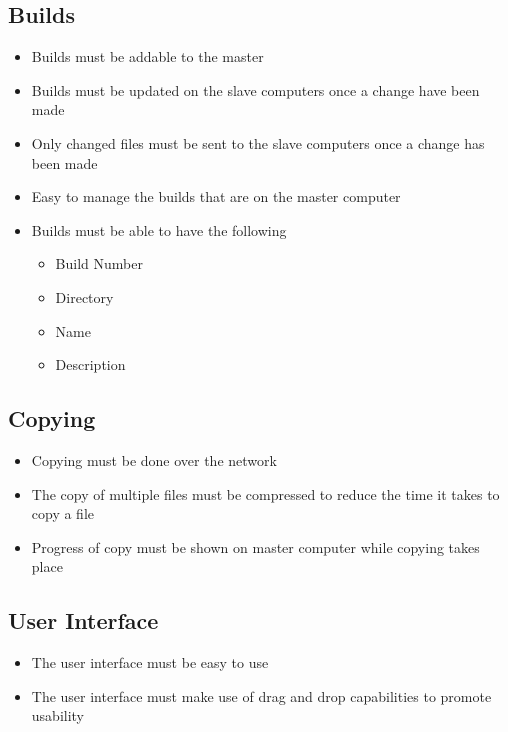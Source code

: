 \documentclass[a4paper,12pt,final]{article}
\begin{document}
\subsection{Builds}
\begin{itemize}
\item Builds must be addable to the master
\item Builds must be updated on the slave computers once a change have been made
\item Only changed files must be sent to the slave computers once a change has been made
\item Easy to manage the builds that are on the master computer
\item Builds must be able to have the following
\begin{itemize}
\item Build Number
\item Directory
\item Name
\item Description
\end{itemize}
\end{itemize}

\subsection{Copying}
\begin{itemize}
\item Copying must be done over the network
\item The copy of multiple files must be compressed to reduce the time it takes to copy a file
\item Progress of copy must be shown on master computer while copying takes place
\end{itemize}

\subsection{User Interface}
\begin{itemize}
\item The user interface must be easy to use
\item The user interface must make use of drag and drop capabilities to promote usability
\end{itemize}
\end{document}
